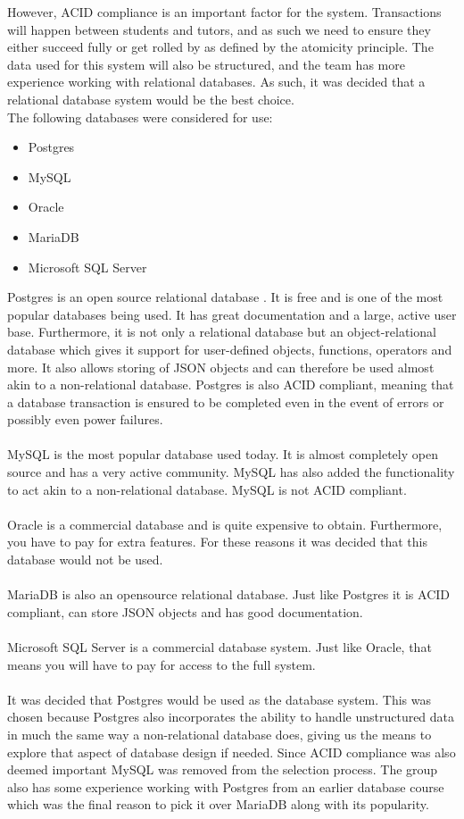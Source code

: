 However, ACID compliance is an important factor for the system.
Transactions will happen between students and tutors, and as such we need to ensure they either succeed fully or get rolled by as defined by the atomicity principle.
The data used for this system will also be structured, and the team has more experience working with relational databases.
As such, it was decided that a relational database system would be the best choice.
\\
The following databases were considered for use:
\begin{itemize}
    \item Postgres
    \item MySQL
    \item Oracle
    \item MariaDB
    \item Microsoft SQL Server
\end{itemize}
Postgres is an open source relational database \cite{Postgres}.
It is free and is one of the most popular databases being used\cite{databasePopularity}.
It has great documentation and a large, active user base.
Furthermore, it is not only a relational database but an object-relational database which gives it support for user-defined objects, functions, operators and more.
It also allows storing of JSON objects and can therefore be used almost akin to a non-relational database.
Postgres is also ACID compliant, meaning that a database transaction is ensured to be completed even in the event of errors or possibly even power failures.
\\
\\
MySQL is the most popular database used today\cite{databasePopularity}.
It is almost completely open source and has a very active community\cite{MySQL}.
MySQL has also added the functionality to act akin to a non-relational database.
MySQL is not ACID compliant.
\\
\\
Oracle is a commercial database and is quite expensive to obtain\cite{oracle}.
Furthermore, you have to pay for extra features.
For these reasons it was decided that this database would not be used.
\\
\\
MariaDB is also an opensource relational database\cite{MariaDB}.
Just like Postgres it is ACID compliant, can store JSON objects and has good documentation.
\\
\\
Microsoft SQL Server is a commercial database system\cite{MSSQLSERVER}.
Just like Oracle, that means you will have to pay for access to the full system.
\\
\\
It was decided that Postgres would be used as the database system.
This was chosen because Postgres also incorporates the ability to handle unstructured data in much the same way a non-relational database does, giving us the means to explore that aspect of database design if needed.
Since ACID compliance was also deemed important MySQL was removed from the selection process. 
The group also has some experience working with Postgres from an earlier database course which was the final reason to pick it over MariaDB along with its popularity.
